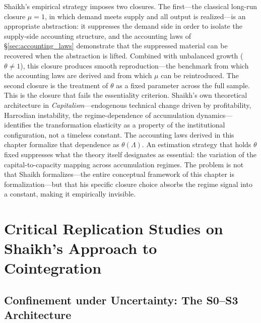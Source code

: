 \documentclass[11pt,a4paper]{article}
\begin{document}
Shaikh's empirical strategy imposes two closures. The first---the classical long-run closure $\mu = 1$, in which demand meets supply and all output is realized---is an appropriate abstraction: it suppresses the demand side in order to isolate the supply-side accounting structure, and the accounting laws of \S\ref{sec:accounting_laws} demonstrate that the suppressed material can be recovered when the abstraction is lifted. Combined with unbalanced growth ($\theta \neq 1$), this closure produces smooth reproduction---the benchmark from which the accounting laws are derived and from which $\mu$ can be reintroduced. The second closure is the treatment of $\theta$ as a fixed parameter across the full sample. This is the closure that fails the essentiality criterion. Shaikh's own theoretical architecture in \emph{Capitalism}---endogenous technical change driven by profitability, Harrodian instability, the regime-dependence of accumulation dynamics---identifies the transformation elasticity as a property of the institutional configuration, not a timeless constant. The accounting laws derived in this chapter formalize that dependence as $\theta(\Lambda)$. An estimation strategy that holds $\theta$ fixed suppresses what the theory itself designates as essential: the variation of the capital-to-capacity mapping across accumulation regimes. The problem is not that Shaikh formalizes---the entire conceptual framework of this chapter is formalization---but that his specific closure choice absorbs the regime signal into a constant, making it empirically invisible.



\section{Critical Replication Studies on Shaikh's Approach to Cointegration}
\label{sec:critical_replication}



\subsection{Confinement under Uncertainty: The S0--S3 Architecture}
\label{sec:confinement_architecture}
\end{document}
